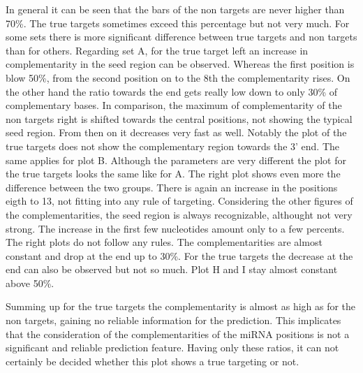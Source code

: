 \documentclass[12pt]{article}
\begin{document}
In general it can be seen that the bars of the non targets are never higher than 70\%. The true targets sometimes exceed this percentage but not very much. For some sets there is more significant difference between true targets and non targets than for others. Regarding set A, for the true target left an increase in complementarity in the seed region can be observed. Whereas the first position is blow 50\%, from the second position on to the 8th the complementarity rises. On the other hand the ratio towards the end gets really low down to only 30\% of complementary bases. In comparison, the maximum of complementarity of the non targets right is shifted towards the central positions, not showing the typical seed region. From then on it decreases very fast as well. Notably the plot of the true targets does not show the complementary region towards the 3' end. The same applies for plot B. Although the parameters are very different the plot for the true targets looks the same like for A. The right plot shows even more the difference between the two groups. There is again an increase in the positions eigth to 13, not fitting into any rule of targeting.
Considering the other figures of the complementarities, the seed region is always recognizable, althought not very strong. The increase in the first few nucleotides amount only to a few percents. The right plots do not follow any rules. The complementarities are almost constant and drop at the end up to 30\%. For the true targets the decrease at the end can also be observed but not so much. Plot H and I stay almost constant above 50\%.

Summing up for the true targets the complementarity is almost as high as for the non targets, gaining no reliable information for the prediction. This implicates that the consideration of the complementarities of the miRNA positions is not a significant and reliable prediction feature. Having only these ratios, it can not certainly be decided whether this plot shows a true targeting or not. \\
\end{document}
